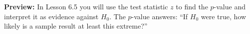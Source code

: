 \documentclass[10pt]{article}
\begin{document}
\begin{reflectionbox}
\textbf{Preview:} In Lesson 6.5 you will use the test statistic $z$ to find the $p$-value
and interpret it as evidence against $H_0$. The $p$-value answers: ``If $H_0$ were true,
how likely is a sample result at least this extreme?''
\end{reflectionbox}
\end{document}
